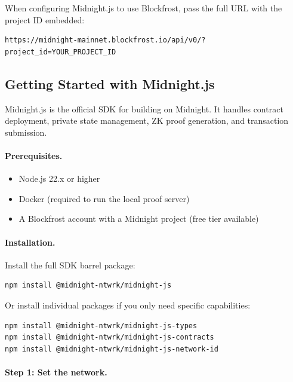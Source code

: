 When configuring Midnight.js to use Blockfrost, pass the full URL with the project ID embedded:

\begin{verbatim}
https://midnight-mainnet.blockfrost.io/api/v0/?project_id=YOUR_PROJECT_ID
\end{verbatim}

\subsection*{Getting Started with Midnight.js}

Midnight.js is the official SDK for building on Midnight. It handles contract deployment, private state management, ZK proof generation, and transaction submission.

\paragraph{Prerequisites.}

\begin{itemize}
  \item Node.js 22.x or higher
  \item Docker (required to run the local proof server)
  \item A Blockfrost account with a Midnight project (free tier available)
\end{itemize}

\paragraph{Installation.}

Install the full SDK barrel package:

\begin{verbatim}
npm install @midnight-ntwrk/midnight-js
\end{verbatim}

Or install individual packages if you only need specific capabilities:

\begin{verbatim}
npm install @midnight-ntwrk/midnight-js-types
npm install @midnight-ntwrk/midnight-js-contracts
npm install @midnight-ntwrk/midnight-js-network-id
\end{verbatim}

\paragraph{Step 1: Set the network.}

